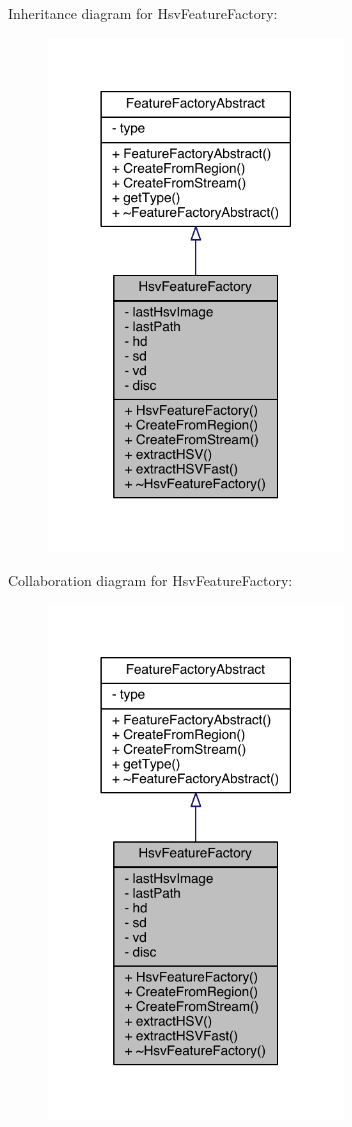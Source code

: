 Inheritance diagram for Hsv\+Feature\+Factory\+:
\nopagebreak
\begin{figure}[H]
\begin{center}
\leavevmode
\includegraphics[width=222pt]{class_hsv_feature_factory__inherit__graph}
\end{center}
\end{figure}


Collaboration diagram for Hsv\+Feature\+Factory\+:
\nopagebreak
\begin{figure}[H]
\begin{center}
\leavevmode
\includegraphics[width=222pt]{class_hsv_feature_factory__coll__graph}
\end{center}
\end{figure}


